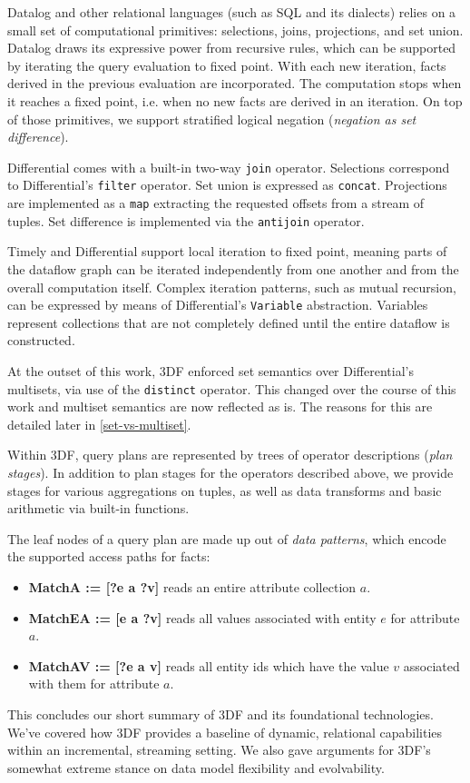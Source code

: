 \documentclass[../index.tex]{subfiles}
\begin{document}
Datalog and other relational languages (such as SQL and its dialects)
relies on a small set of computational primitives: selections, joins,
projections, and set union. Datalog draws its expressive power from
recursive rules, which can be supported by iterating the query
evaluation to fixed point. With each new iteration, facts derived in
the previous evaluation are incorporated. The computation stops when
it reaches a fixed point, i.e. when no new facts are derived in an
iteration. On top of those primitives, we support stratified logical
negation (\emph{negation as set difference}).

Differential comes with a built-in two-way \texttt{join}
operator. Selections correspond to Differential's \texttt{filter}
operator. Set union is expressed as \texttt{concat}. Projections are
implemented as a \texttt{map} extracting the requested offsets from a
stream of tuples. Set difference is implemented via the
\texttt{antijoin} operator.

Timely and Differential support local iteration to fixed point,
meaning parts of the dataflow graph can be iterated independently from
one another and from the overall computation itself. Complex iteration
patterns, such as mutual recursion, can be expressed by means of
Differential's \texttt{Variable} abstraction. Variables represent
collections that are not completely defined until the entire dataflow
is constructed.

At the outset of this work, 3DF enforced set semantics over
Differential's multisets, via use of the \texttt{distinct}
operator. This changed over the course of this work and multiset
semantics are now reflected as is. The reasons for this are detailed
later in \autoref{set-vs-multiset}.

Within 3DF, query plans are represented by trees of operator
descriptions (\emph{plan stages}). In addition to plan stages for the
operators described above, we provide stages for various aggregations
on tuples, as well as data transforms and basic arithmetic via
built-in functions.

The leaf nodes of a query plan are made up out of \emph{data
  patterns}, which encode the supported access paths for facts:

\begin{itemize}
\item \textbf{MatchA := [?e a ?v]} reads an entire attribute
  collection $a$.
\item \textbf{MatchEA := [e a ?v]} reads all values associated with
  entity $e$ for attribute $a$.
\item \textbf{MatchAV := [?e a v]} reads all entity ids which have the
  value $v$ associated with them for attribute $a$.
\end{itemize}

This concludes our short summary of 3DF and its foundational
technologies. We've covered how 3DF provides a baseline of dynamic,
relational capabilities within an incremental, streaming setting. We
also gave arguments for 3DF's somewhat extreme stance on data model
flexibility and evolvability.
\end{document}
